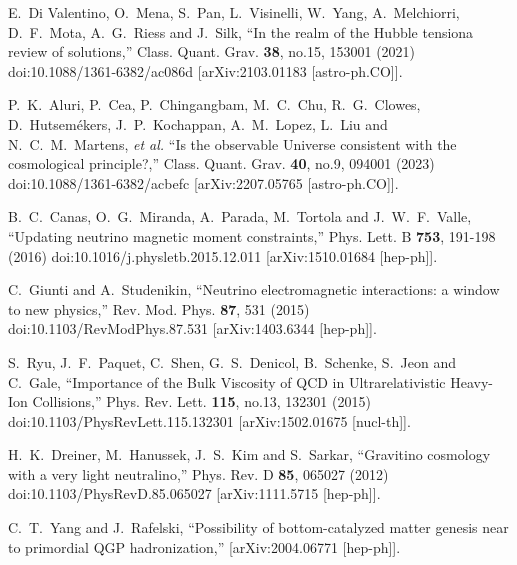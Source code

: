 \begin{thebibliography}{99}
E.~Di Valentino, O.~Mena, S.~Pan, L.~Visinelli, W.~Yang, A.~Melchiorri, D.~F.~Mota, A.~G.~Riess and J.~Silk,
``In the realm of the Hubble tension\textemdash{}a review of solutions,''
Class. Quant. Grav. \textbf{38}, no.15, 153001 (2021)
doi:10.1088/1361-6382/ac086d
[arXiv:2103.01183 [astro-ph.CO]].

P.~K.~Aluri, P.~Cea, P.~Chingangbam, M.~C.~Chu, R.~G.~Clowes, D.~Hutsem\'ekers, J.~P.~Kochappan, A.~M.~Lopez, L.~Liu and N.~C.~M.~Martens, \textit{et al.}
``Is the observable Universe consistent with the cosmological principle?,''
Class. Quant. Grav. \textbf{40}, no.9, 094001 (2023)
doi:10.1088/1361-6382/acbefc
[arXiv:2207.05765 [astro-ph.CO]].

B.~C.~Canas, O.~G.~Miranda, A.~Parada, M.~Tortola and J.~W.~F.~Valle,
``Updating neutrino magnetic moment constraints,''
Phys. Lett. B \textbf{753}, 191-198 (2016)
doi:10.1016/j.physletb.2015.12.011
[arXiv:1510.01684 [hep-ph]].

C.~Giunti and A.~Studenikin,
``Neutrino electromagnetic interactions: a window to new physics,''
Rev. Mod. Phys. \textbf{87}, 531 (2015)
doi:10.1103/RevModPhys.87.531
[arXiv:1403.6344 [hep-ph]].

S.~Ryu, J.~F.~Paquet, C.~Shen, G.~S.~Denicol, B.~Schenke, S.~Jeon and C.~Gale,
``Importance of the Bulk Viscosity of QCD in Ultrarelativistic Heavy-Ion Collisions,''
Phys. Rev. Lett. \textbf{115}, no.13, 132301 (2015)
doi:10.1103/PhysRevLett.115.132301
[arXiv:1502.01675 [nucl-th]].

H.~K.~Dreiner, M.~Hanussek, J.~S.~Kim and S.~Sarkar,
``Gravitino cosmology with a very light neutralino,''
Phys. Rev. D \textbf{85}, 065027 (2012)
doi:10.1103/PhysRevD.85.065027
[arXiv:1111.5715 [hep-ph]].

C.~T.~Yang and J.~Rafelski,
``Possibility of bottom-catalyzed matter genesis near to primordial QGP hadronization,''
[arXiv:2004.06771 [hep-ph]].


\end{thebibliography}
